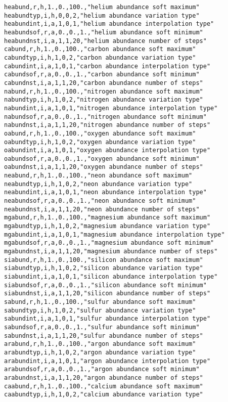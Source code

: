 \begin{verbatim}
heabund,r,h,1.,0.,100.,"helium abundance soft maximum"
heabundtyp,i,h,0,0,2,"helium abundance variation type"
heabundint,i,a,1,0,1,"helium abundance interpolation type"
heabundsof,r,a,0.,0.,1.,"helium abundance soft minimum"
heabundnst,i,a,1,1,20,"helium abundance number of steps"
cabund,r,h,1.,0.,100.,"carbon abundance soft maximum"
cabundtyp,i,h,1,0,2,"carbon abundance variation type"
cabundint,i,a,1,0,1,"carbon abundance interpolation type"
cabundsof,r,a,0.,0.,1.,"carbon abundance soft minimum"
cabundnst,i,a,1,1,20,"carbon abundance number of steps"
nabund,r,h,1.,0.,100.,"nitrogen abundance soft maximum"
nabundtyp,i,h,1,0,2,"nitrogen abundance variation type"
nabundint,i,a,1,0,1,"nitrogen abundance interpolation type"
nabundsof,r,a,0.,0.,1.,"nitrogen abundance soft minimum"
nabundnst,i,a,1,1,20,"nitrogen abundance number of steps"
oabund,r,h,1.,0.,100.,"oxygen abundance soft maximum"
oabundtyp,i,h,1,0,2,"oxygen abundance variation type"
oabundint,i,a,1,0,1,"oxygen abundance interpolation type"
oabundsof,r,a,0.,0.,1.,"oxygen abundance soft minimum"
oabundnst,i,a,1,1,20,"oxygen abundance number of steps"
neabund,r,h,1.,0.,100.,"neon abundance soft maximum"
neabundtyp,i,h,1,0,2,"neon abundance variation type"
neabundint,i,a,1,0,1,"neon abundance interpolation type"
neabundsof,r,a,0.,0.,1.,"neon abundance soft minimum"
neabundnst,i,a,1,1,20,"neon abundance number of steps"
mgabund,r,h,1.,0.,100.,"magnesium abundance soft maximum"
mgabundtyp,i,h,1,0,2,"magnesium abundance variation type"
mgabundint,i,a,1,0,1,"magnesium abundance interpolation type"
mgabundsof,r,a,0.,0.,1.,"magnesium abundance soft minimum"
mgabundnst,i,a,1,1,20,"magnesium abundance number of steps"
siabund,r,h,1.,0.,100.,"silicon abundance soft maximum"
siabundtyp,i,h,1,0,2,"silicon abundance variation type"
siabundint,i,a,1,0,1,"silicon abundance interpolation type"
siabundsof,r,a,0.,0.,1.,"silicon abundance soft minimum"
siabundnst,i,a,1,1,20,"silicon abundance number of steps"
sabund,r,h,1.,0.,100.,"sulfur abundance soft maximum"
sabundtyp,i,h,1,0,2,"sulfur abundance variation type"
sabundint,i,a,1,0,1,"sulfur abundance interpolation type"
sabundsof,r,a,0.,0.,1.,"sulfur abundance soft minimum"
sabundnst,i,a,1,1,20,"sulfur abundance number of steps"
arabund,r,h,1.,0.,100.,"argon abundance soft maximum"
arabundtyp,i,h,1,0,2,"argon abundance variation type"
arabundint,i,a,1,0,1,"argon abundance interpolation type"
arabundsof,r,a,0.,0.,1.,"argon abundance soft minimum"
arabundnst,i,a,1,1,20,"argon abundance number of steps"
caabund,r,h,1.,0.,100.,"calcium abundance soft maximum"
caabundtyp,i,h,1,0,2,"calcium abundance variation type"

\end{verbatim}
